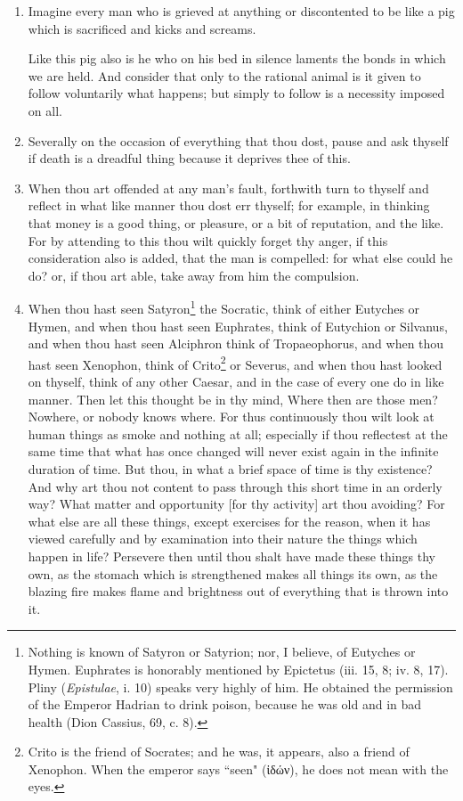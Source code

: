 \begin{enumerate}
\item Imagine every man who is grieved at anything or discontented to be like a pig which is sacrificed and kicks and screams.

Like this pig also is he who on his bed in silence laments the bonds in which we are held. And consider that only to the rational animal is it given to follow voluntarily what happens; but simply to follow is a necessity imposed on all.

\item Severally on the occasion of everything that thou dost, pause and ask thyself if death is a dreadful thing because it deprives thee of this.

\item When thou art offended at any man's fault, forthwith turn to thyself and reflect in what like manner thou dost err thyself; for example, in thinking that money is a good thing, or pleasure, or a bit of reputation, and the like. For by attending to this thou wilt quickly forget thy anger, if this consideration also is added, that the man is compelled: for what else could he do? or, if thou art able, take away from him the compulsion.

\item When thou hast seen Satyron\footnote{Nothing is known of Satyron or Satyrion; nor, I believe, of Eutyches or Hymen. Euphrates is honorably mentioned by Epictetus (iii. 15, 8; iv. 8, 17). Pliny (\textit{Epistulae}, i. 10) speaks very highly of him. He obtained the permission of the Emperor Hadrian to drink poison, because he was old and in bad health (Dion Cassius, 69, c. 8).} the Socratic, think of either Eutyches or Hymen, and when thou hast seen Euphrates, think of Eutychion or Silvanus, and when thou hast seen Alciphron think of Tropaeophorus, and when thou hast seen Xenophon, think of Crito\footnote{Crito is the friend of Socrates; and he was, it appears, also a friend of Xenophon. When the emperor says ``seen" (\textgreek{ἰδών}), he does not mean with the eyes.} or Severus, and when thou hast looked on thyself, think of any other Caesar, and in the case of every one do in like manner. Then let this thought be in thy mind, Where then are those men? Nowhere, or nobody knows where. For thus continuously thou wilt look at human things as smoke and nothing at all; especially if thou reflectest at the same time that what has once changed will never exist again in the infinite duration of time. But thou, in what a brief space of time is thy existence? And why art thou not content to pass through this short time in an orderly way? What matter and opportunity [{\clarify for thy activity}] art thou avoiding? For what else are all these things, except exercises for the reason, when it has viewed carefully and by examination into their nature the things which happen in life? Persevere then until thou shalt have made these things thy own, as the stomach which is strengthened makes all things its own, as the blazing fire makes flame and brightness out of everything that is thrown into it.


\end{enumerate}
